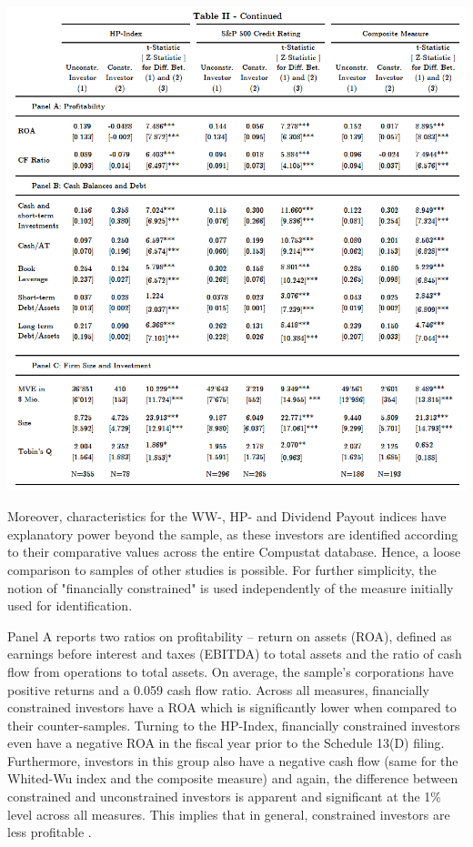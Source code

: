 \documentclass[12pt]{article}
\begin{document}
\begin{table}[!htbp]
	\centering
	\begin{adjustbox}{width=\textwidth}
		\includegraphics{summary2final}
	\end{adjustbox}
\end{table}
Moreover, characteristics for the WW-, HP- and Dividend Payout indices have explanatory power beyond the sample, as these investors are identified according to their comparative values across the entire Compustat database. Hence, a loose comparison to samples of other studies is possible. For further simplicity, the notion of "financially constrained" is used independently of the measure initially used for identification.\par
Panel A reports two ratios on profitability -- return on assets (ROA), defined as earnings before interest and taxes (EBITDA) to total assets and the ratio of cash flow from operations to total assets. On average, the sample's corporations have positive returns and a 0.059 cash flow ratio. Across all measures, financially constrained investors have a ROA which is significantly lower when compared to their counter-samples. Turning to the HP-Index, financially constrained investors even have a negative ROA in the fiscal year prior to the Schedule 13(D) filing. Furthermore, investors in this group also have a negative cash flow (same for the Whited-Wu index and the composite measure) and again, the difference between constrained and unconstrained investors is apparent and significant at the 1\% level across all measures. This implies that in general, constrained investors are less profitable \citep[p.544]{Whited2006}.\par
\end{document}
